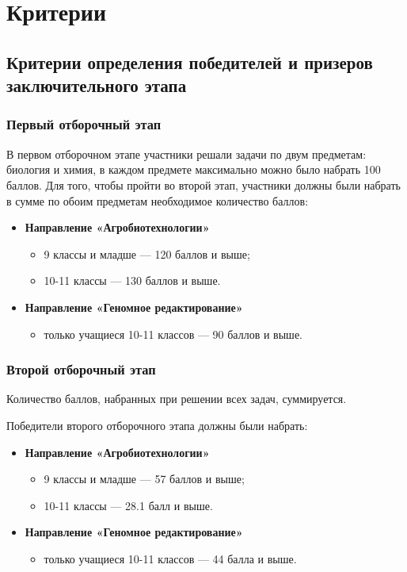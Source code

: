 \part{Критерии}

\chapter{Критерии определения победителей и призеров заключительного этапа}
 
\section{Первый отборочный этап}

В первом отборочном этапе участники решали задачи по двум предметам: биология и химия, в каждом предмете максимально можно было набрать 100 баллов. Для того, чтобы пройти во второй этап, участники должны были набрать в сумме по обоим предметам необходимое количество баллов:
\begin{itemize}
    \item \textbf{Направление «Агробиотехнологии»}
    \begin{itemize}
        \item 9 классы и младше — 120 баллов и выше;
        \item 10-11 классы — 130 баллов и выше.
    \end{itemize}
    \item \textbf{Направление «Геномное редактирование»}
    \begin{itemize}
        \item только учащиеся 10-11 классов — 90 баллов и выше.
    \end{itemize}
\end{itemize}

\section{Второй отборочный этап}

Количество баллов, набранных при решении всех задач, суммируется. 

Победители второго отборочного этапа должны были набрать:
\begin{itemize}
    \item \textbf{Направление «Агробиотехнологии»}
    \begin{itemize}
        \item 9 классы и младше — 57 баллов и выше;
        \item 10-11 классы — 28.1 балл и выше.
    \end{itemize}
    \item \textbf{Направление «Геномное редактирование»}
    \begin{itemize}
        \item только учащиеся 10-11 классов — 44 балла и выше.
    \end{itemize}
\end{itemize}

